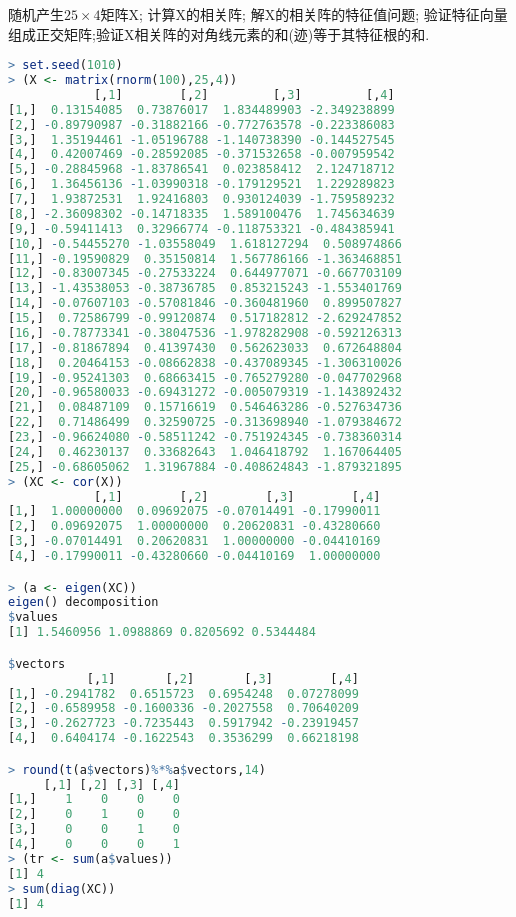 \documentclass[11pt,a4paper,oneside]{book}
\begin{document}
随机产生$ 25\times 4 $矩阵X; 计算X的相关阵; 解X的相关阵的特征值问题; 验证特征向量组成正交矩阵;验证X相关阵的对角线元素的和(迹)等于其特征根的和.
\begin{lstlisting}[language=r]
> set.seed(1010)
> (X <- matrix(rnorm(100),25,4))
            [,1]        [,2]         [,3]         [,4]
[1,]  0.13154085  0.73876017  1.834489903 -2.349238899
[2,] -0.89790987 -0.31882166 -0.772763578 -0.223386083
[3,]  1.35194461 -1.05196788 -1.140738390 -0.144527545
[4,]  0.42007469 -0.28592085 -0.371532658 -0.007959542
[5,] -0.28845968 -1.83786541  0.023858412  2.124718712
[6,]  1.36456136 -1.03990318 -0.179129521  1.229289823
[7,]  1.93872531  1.92416803  0.930124039 -1.759589232
[8,] -2.36098302 -0.14718335  1.589100476  1.745634639
[9,] -0.59411413  0.32966774 -0.118753321 -0.484385941
[10,] -0.54455270 -1.03558049  1.618127294  0.508974866
[11,] -0.19590829  0.35150814  1.567786166 -1.363468851
[12,] -0.83007345 -0.27533224  0.644977071 -0.667703109
[13,] -1.43538053 -0.38736785  0.853215243 -1.553401769
[14,] -0.07607103 -0.57081846 -0.360481960  0.899507827
[15,]  0.72586799 -0.99120874  0.517182812 -2.629247852
[16,] -0.78773341 -0.38047536 -1.978282908 -0.592126313
[17,] -0.81867894  0.41397430  0.562623033  0.672648804
[18,]  0.20464153 -0.08662838 -0.437089345 -1.306310026
[19,] -0.95241303  0.68663415 -0.765279280 -0.047702968
[20,] -0.96580033 -0.69431272 -0.005079319 -1.143892432
[21,]  0.08487109  0.15716619  0.546463286 -0.527634736
[22,]  0.71486499  0.32590725 -0.313698940 -1.079384672
[23,] -0.96624080 -0.58511242 -0.751924345 -0.738360314
[24,]  0.46230137  0.33682643  1.046418792  1.167064405
[25,] -0.68605062  1.31967884 -0.408624843 -1.879321895
> (XC <- cor(X))
            [,1]        [,2]        [,3]        [,4]
[1,]  1.00000000  0.09692075 -0.07014491 -0.17990011
[2,]  0.09692075  1.00000000  0.20620831 -0.43280660
[3,] -0.07014491  0.20620831  1.00000000 -0.04410169
[4,] -0.17990011 -0.43280660 -0.04410169  1.00000000

> (a <- eigen(XC))
eigen() decomposition
$values
[1] 1.5460956 1.0988869 0.8205692 0.5344484

$vectors
           [,1]       [,2]       [,3]        [,4]
[1,] -0.2941782  0.6515723  0.6954248  0.07278099
[2,] -0.6589958 -0.1600336 -0.2027558  0.70640209
[3,] -0.2627723 -0.7235443  0.5917942 -0.23919457
[4,]  0.6404174 -0.1622543  0.3536299  0.66218198

> round(t(a$vectors)%*%a$vectors,14)
     [,1] [,2] [,3] [,4]
[1,]    1    0    0    0
[2,]    0    1    0    0
[3,]    0    0    1    0
[4,]    0    0    0    1
> (tr <- sum(a$values))
[1] 4
> sum(diag(XC))
[1] 4
\end{lstlisting}
\end{document}
